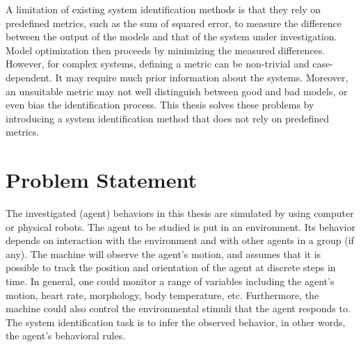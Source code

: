 A limitation of existing system identification methods is that they rely on predefined metrics, such as the sum of squared error, to measure the difference between the output of the models and that of the system under investigation. Model optimization then proceeds by minimizing the measured differences. However, for complex systems, defining a metric can be non-trivial and case-dependent. It may require much prior information about the systems. Moreover, an unsuitable metric may not well distinguish between good and bad models, or even bias the identification process. This thesis solves these problems by introducing a system identification method that does not rely on predefined metrics.


\section{Problem Statement}

The investigated (agent) behaviors in this thesis are simulated by using computer or physical robots. The agent to be studied is put in an environment. Its behavior depends on interaction with the environment and with other agents in a group (if any). The machine will observe the agent's motion, and assumes that it is possible to track the position and orientation of the agent at discrete steps in time. In general, one could monitor a range of variables including the agent's motion, heart rate, morphology, body temperature, etc. Furthermore, the machine could also control the environmental stimuli that the agent responds to. The system identification task is to infer the observed behavior, in other words, the agent's behavioral rules. 

